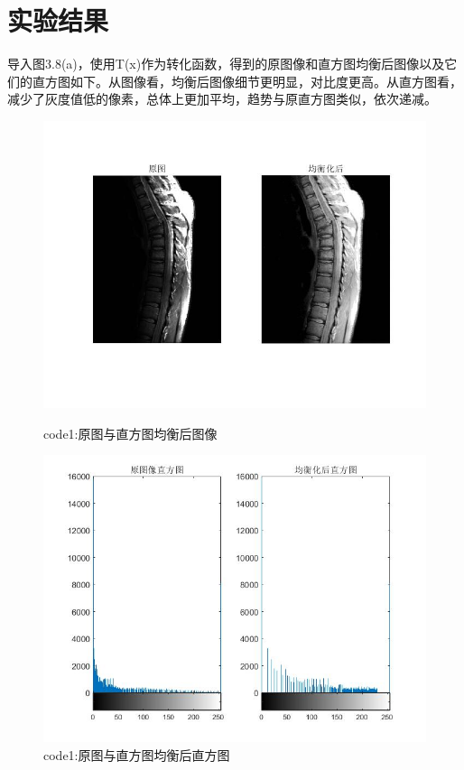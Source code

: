\documentclass{article}
\begin{document}
	\section{实验结果}
	导入图3.8(a)，使用T(x)作为转化函数，得到的原图像和直方图均衡后图像以及它们的直方图如下。从图像看，均衡后图像细节更明显，对比度更高。从直方图看，减少了灰度值低的像素，总体上更加平均，趋势与原直方图类似，依次递减。
	\begin{figure}[H]
		\centering
		\begin{minipage}{0.49\linewidth}
			\centering
			\includegraphics[width=0.9\linewidth]{figures/test3.JPG}
			\caption{code1:原图与直方图均衡后图像}
		\end{minipage}
		\begin{minipage}{0.49\linewidth}
			\centering
			\includegraphics[width=0.9\linewidth]{figures/test4.JPG}
			\caption{code1:原图与直方图均衡后直方图}
		\end{minipage}
	\end{figure}
\end{document}
